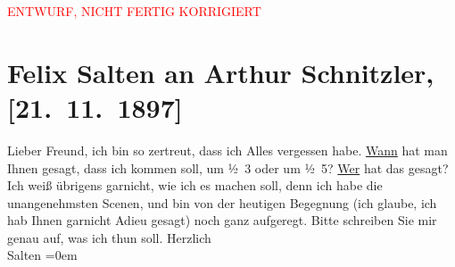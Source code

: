 
\begin{center}
            \textcolor{red}{ENTWURF, NICHT FERTIG KORRIGIERT}
                      \end{center}
            
         \renewcommand{\erwaehnteOrte}{Orte: Wien}
         \renewcommand{\erwaehnteWerke}{}
               \section[Felix Salten an Arthur Schnitzler, {[}21. 11. 1897{]}]{ Felix Salten an Arthur Schnitzler, {[}21. 11. 1897{]}}\nopagebreak{}\rehead{ }\begin{ledgroupsized}[t]{13cm}\normalsize\beginnumbering \toendnotes[C]{\smallbreak\pagebreak[2]} 
\pstart
           \noindent{}{\pb} Lieber Freund, ich bin so zertreut, dass ich Alles vergessen habe.
                  \uline{Wann} hat man Ihnen gesagt, dass ich kommen soll,
               um ½ 3 oder um ½ 5? \uline{Wer} hat das gesagt? Ich weiß übrigens garnicht, wie ich es machen soll, denn
               ich habe die unangenehmsten {\pb}Scenen, und bin von der heutigen Begegnung (ich glaube, ich hab Ihnen garnicht
               Adieu gesagt) noch ganz aufgeregt. \pend
           \pstart
           Bitte schreiben Sie mir genau auf, was ich thun soll.\pend
           \pstart
           Herzlich {\\[\baselineskip]}\spacefill\mbox{Salten}\pend
           \leftskip=0em{}
         
         \endnumbering{}\end{ledgroupsized}\begin{anhang}\end{anhang}\newcommand{\dateiname}{L03276}\newcommand{\titel}{Felix Salten an Arthur Schnitzler, [21. 11. 1897]}\newcommand{\editorInnen}{Martin Anton Müller und Laura Untner}
      